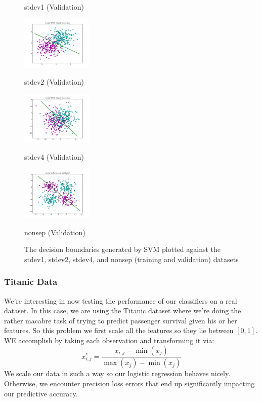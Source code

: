 \documentclass[10pt]{article}
\begin{document}
\begin{figure}[ht]
\begin{minipage}[b]{.24\linewidth}
		\caption*{stdev1 (Validation)}
	\end{minipage}
	\begin{minipage}[b]{.24\linewidth}
		\includegraphics[width=1\linewidth, height=1in]{linear_svm_stdev2_validation.png}
		\caption*{stdev2 (Validation)}
	\end{minipage}
	\begin{minipage}[b]{.24\linewidth}
		\includegraphics[width=1\linewidth, height=1in]{linear_svm_stdev4_validation.png}
		\caption*{stdev4 (Validation)}
	\end{minipage}
	\begin{minipage}[b]{.24\linewidth}
		\includegraphics[width=1\linewidth, height=1in]{linear_svm_nonsep_validation.png}
		\caption*{nonsep (Validation)}
	\end{minipage}
	\caption{The decision boundaries generated by SVM plotted against the stdev1, stdev2, stdev4, and nonsep (training and validation) datasets}
\end{figure}

\subsubsection*{Titanic Data}
We're interesting in now testing the performance of our classifiers on a real dataset. In this case, we are using the Titanic dataset where we're doing the rather macabre task of trying to predict passenger survival given his or her features. So this problem we first scale all the features so they lie between $[0,1]$. WE accomplish by taking each observation and transforming it via:
\begin{equation*}
	x_{i,j}^* = \frac{x_{i,j}-\min(x_j)}{\max(x_j) - \min(x_j)}
\end{equation*}
We scale our data in such a way so our logistic regression behaves nicely. Otherwise, we encounter precision loss errors that end up significantly impacting our predictive accuracy. 
\end{document}
